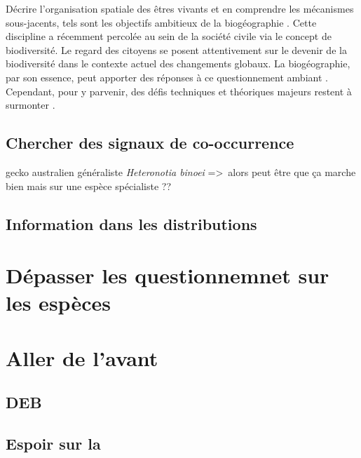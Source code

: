 Décrire l'organisation spatiale des êtres vivants et en comprendre les
mécanismes sous-jacents, tels sont les objectifs ambitieux de la
biogéographie \cite{MacArthur1967}. Cette discipline a récemment
percolée au sein de la société civile via le concept de biodiversité. Le
regard des citoyens se posent attentivement sur le devenir de la
biodiversité dans le contexte actuel des changements globaux. La
biogéographie, par son essence, peut apporter des réponses à ce
questionnement ambiant \cite{Whittaker2005}. Cependant, pour y parvenir,
des défis techniques et théoriques majeurs restent à surmonter
\cite{Beck2012}.

\subsection*{Chercher des signaux de
co-occurrence}\label{chercher-des-signaux-de-co-occurrence}

gecko australien généraliste \emph{Heteronotia binoei}
=\textgreater{}~alors peut être que ça marche bien mais sur une espèce
spécialiste ??

\subsection*{Information dans les
distributions}\label{information-dans-les-distributions}

\section{Dépasser les questionnemnet sur les
espèces}\label{duxe9passer-les-questionnemnet-sur-les-espuxe8ces}

\section*{Aller de l'avant}\label{aller-de-lavant}

\subsection{DEB}\label{deb}

\subsection{Espoir sur la}\label{espoir-sur-la}

